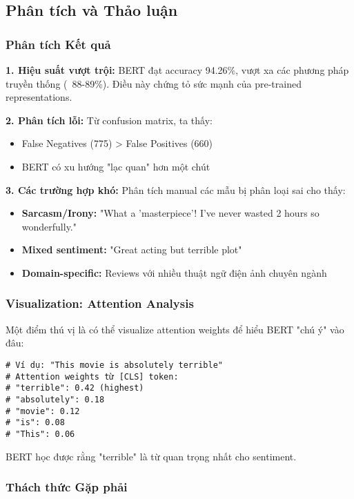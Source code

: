 \subsection{Phân tích và Thảo luận}
\label{ssec:thao_luan_huong_phat_trien_sa}

\subsubsection{Phân tích Kết quả}

\textbf{1. Hiệu suất vượt trội:}
BERT đạt accuracy 94.26\%, vượt xa các phương pháp truyền thống (~88-89\%). Điều này chứng tỏ sức mạnh của pre-trained representations.

\textbf{2. Phân tích lỗi:}
Từ confusion matrix, ta thấy:
\begin{itemize}
    \item False Negatives (775) > False Positives (660)
    \item BERT có xu hướng "lạc quan" hơn một chút
\end{itemize}

\textbf{3. Các trường hợp khó:}
Phân tích manual các mẫu bị phân loại sai cho thấy:
\begin{itemize}
    \item \textbf{Sarcasm/Irony:} "What a 'masterpiece'! I've never wasted 2 hours so wonderfully."
    \item \textbf{Mixed sentiment:} "Great acting but terrible plot"
    \item \textbf{Domain-specific:} Reviews với nhiều thuật ngữ điện ảnh chuyên ngành
\end{itemize}

\subsubsection{Visualization: Attention Analysis}
Một điểm thú vị là có thể visualize attention weights để hiểu BERT "chú ý" vào đâu:

\begin{verbatim}
# Ví dụ: "This movie is absolutely terrible"
# Attention weights từ [CLS] token:
# "terrible": 0.42 (highest)
# "absolutely": 0.18
# "movie": 0.12
# "is": 0.08
# "This": 0.06
\end{verbatim}

BERT học được rằng "terrible" là từ quan trọng nhất cho sentiment.

\subsubsection{Thách thức Gặp phải}

